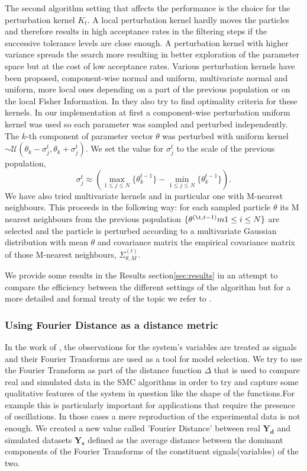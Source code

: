 \documentclass[12pt,a4paper,titlepage]{article}
\begin{document}
The second algorithm setting that affects the performance is the choice for the perturbation kernel $K_{t}$. A local perturbation kernel hardly moves the particles and therefore results in high acceptance rates in the filtering steps if the successive tolerance levels are close enough.  A perturbation kernel with higher variance spreads the search more resulting in better exploration of the parameter space but at the cost of low acceptance rates. Various perturbation kernels have been proposed, component-wise normal and uniform, multivariate normal and uniform, more local ones depending on a part of the previous population or on the local Fisher Information. In \cite{filippi2011optimal} they also try to find optimality criteria for these kernels. In our implementation at first a component-wise perturbation uniform kernel was used so each parameter was sampled and perturbed independently. The $k$-th component of parameter vector $\theta$ was perturbed with uniform kernel $\sim \mathcal{U}(\theta_{k}-\sigma_{j}^{t}, \theta_{k}+\sigma_{j}^{t})$.  We set the value for $\sigma_{j}^{t}$ to the scale of the previous population,
\begin{equation*}
\sigma_{j}^{t} \approx ( \underset{1 \le j \le N}{\max}\{\theta_{k}^{t-1}\} - \underset{1 \le j \le N}{\min}\{\theta_{k}^{t-1}\}).
\end{equation*} 
We have also tried multivariate kernels and in particular one with M-nearest neighbours.  This proceeds in the following way:  for each sampled particle $\theta$ its M nearest neighbours from the previous population $\{ \theta^{(\i, t-1)}m 1 \le i \le N\}$ are selected and the particle is perturbed according to a multivariate Gaussian distribution with mean $\theta$ and covariance matrix the empirical covariance matrix of those M-nearest neighbours, $\Sigma_{\theta, M}^{(t)}$.  

We provide some results in the Results section\ref{sec:results} in an attempt to compare the efficiency between the different settings of the algorithm but for a more detailed and formal treaty of the topic we refer to \cite{filippi2011optimal}. 
\subsubsection{Using Fourier Distance as a distance metric}
In the work of \cite{konopka2010gene}, the observations for the system's variables are treated as signals and their Fourier Transforms are used as a tool for model selection. We try to use the Fourier Transform as part of the distance function $\Delta$ that is used to compare real and simulated data in the SMC algorithms in order to try and capture some qualitative features of the system in question like the shape of the functions.For example this is particularly important for applications that require the presence of oscillations. In those cases a mere reproduction of the experimental data is not enough. We created a new value called 'Fourier Distance' between real $\mathbf{Y_{d}}$ and simulated datasets $\mathbf{Y_{s}}$ defined as the average distance between the dominant components of the Fourier Transforms of the constituent signals(variables) of the two.
\end{document}
